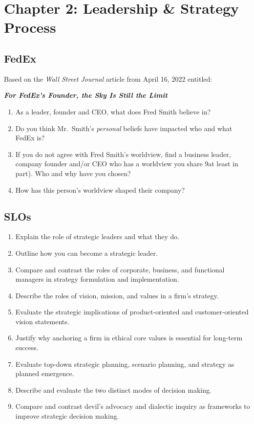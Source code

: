 \documentclass[
]{book}
\providecommand{\tightlist}{%
  \setlength{\itemsep}{0pt}\setlength{\parskip}{0pt}}
\begin{document}
\hypertarget{chapter-2-leadership-strategy-process}{%
\chapter{Chapter 2: Leadership \& Strategy Process}\label{chapter-2-leadership-strategy-process}}

\hypertarget{fedex}{%
\section{FedEx}\label{fedex}}

Based on the \emph{Wall Street Journal} article from April 16, 2022 entitled:

\textbf{\emph{For FedEx's Founder, the Sky Is Still the Limit}}

\begin{enumerate}
\def\labelenumi{\arabic{enumi}.}
\tightlist
\item
  As a leader, founder and CEO, what does Fred Smith believe in?
\item
  Do you think Mr.~Smith's \emph{personal} beliefs have impacted who and what FedEx is?
\item
  If you do not agree with Fred Smith's worldview, find a business leader, company founder and/or CEO who has a worldview you share 9at least in part). Who and why have you chosen?
\item
  How has this person's worldview shaped their company?
\end{enumerate}

\hypertarget{slos-1}{%
\section{SLOs}\label{slos-1}}

\begin{enumerate}
\def\labelenumi{\arabic{enumi}.}
\tightlist
\item
  Explain the role of strategic leaders and what they do.
\item
  Outline how you can become a strategic leader.
\item
  Compare and contrast the roles of corporate, business, and functional managers in strategy formulation and implementation.
\item
  Describe the roles of vision, mission, and values in a firm's strategy.
\item
  Evaluate the strategic implications of product-oriented and customer-oriented vision statements.
\item
  Justify why anchoring a firm in ethical core values is essential for long-term success.
\item
  Evaluate top-down strategic planning, scenario planning, and strategy as planned emergence.
\item
  Describe and evaluate the two distinct modes of decision making.
\item
  Compare and contrast devil's advocacy and dialectic inquiry as frameworks to improve strategic decision making.
\end{enumerate}
\end{document}
